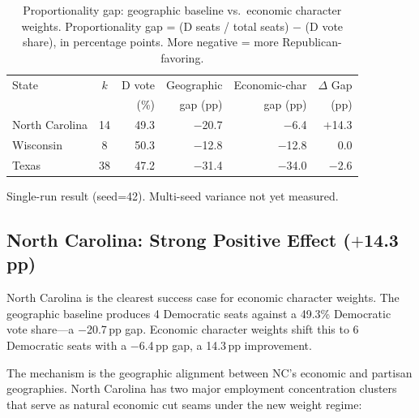 \begin{table}[ht]
\centering
\begin{threeparttable}
\caption{Proportionality gap: geographic baseline vs.\ economic character weights.
  Proportionality gap = (D seats / total seats) $-$ (D vote share),
  in percentage points. More negative = more Republican-favoring.}
\label{tab:main-results}
\begin{tabular}{lcrrrr}
  \toprule
  State & $k$ & D vote & Geographic & Economic-char & $\Delta$ Gap \\
        &     & (\%)   & gap (pp) & gap (pp) & (pp) \\
  \midrule
  North Carolina & 14 & 49.3 & $-$20.7 & $-$6.4  & $+$14.3 \\
  Wisconsin\tnote{$\dagger$}      &  8 & 50.3 & $-$12.8 & $-$12.8 & 0.0  \\
  Texas\tnote{$\dagger$}          & 38 & 47.2 & $-$31.4 & $-$34.0 & $-$2.6 \\
  \bottomrule
\end{tabular}
\begin{tablenotes}
  \small
  \item[$\dagger$] Single-run result (seed=42). Multi-seed variance not yet measured.
\end{tablenotes}
\end{threeparttable}
\end{table}

\subsection{North Carolina: Strong Positive Effect ($+$14.3\,pp)}

North Carolina is the clearest success case for economic character weights.
The geographic baseline produces 4 Democratic seats against a 49.3\% Democratic
vote share---a $-$20.7\,pp gap.
Economic character weights shift this to 6 Democratic seats with a $-$6.4\,pp gap,
a 14.3\,pp improvement.

The mechanism is the geographic alignment between NC's economic and partisan
geographies.
North Carolina has two major employment concentration clusters that serve as
natural economic cut seams under the new weight regime:

